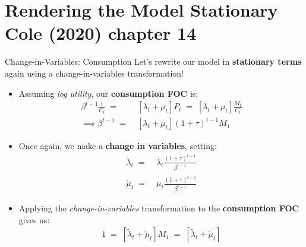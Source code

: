 \documentclass[10pt,c,aspectratio=1610,handout]{beamer}
\begin{document}
\section{Rendering the Model Stationary\\{\small Cole (2020) chapter 14}}%
\begin{frame}{Change-in-Variables: Consumption}%
  Let's rewrite our model in \textbf{stationary terms} again using a change-in-variables transformation!%
  \pause%
  \begin{itemize}%
    \item[$\blacktriangleright$] Assuming \emph{log utility}, our \textbf{consumption FOC} is:%
    \begin{align*}
      \beta^{t-1} \frac{1}{C_{t}} \; = & \; \left[ \lambda_{t}+\mu_{t} \right] P_{t} \; = \; \left[ \lambda_{t}+\mu_{t} \right] \frac{M_{t}}{C_{t}} \\%
      \implies \beta^{t-1} \; = & \; \left[ \lambda_{t}+\mu_{t}\right] (1+\tau)^{t-1} M_{1}%
    \end{align*}%
    \pause%
    \item[$\blacktriangleright$] Once again, we make a \textbf{change in variables}, setting:%
    \begin{align*}%
      \tilde{\lambda}_{t} \; = & \; \lambda_{t} \frac{(1+\tau)^{t-1}}{\beta^{t-1}}\\%
      \tilde{\mu}_{t} \; = & \; \mu_{t} \frac{(1+\tau)^{t-1}}{\beta^{t-1}}%
    \end{align*}%
    \pause%
    \item[$\blacktriangleright$] Applying the \emph{change-in-variables} transformation to the \textbf{consumption FOC} gives us:%
    \begin{align*}%
      1 \; = \; \left[ \tilde{\lambda}_{t}+\tilde{\mu}_{t} \right] M_{1} \; = \; \left[ \tilde{\lambda}_{t}+\tilde{\mu}_{t}\right]%
    \end{align*}%
  \end{itemize}%
\end{frame}%
\end{document}
